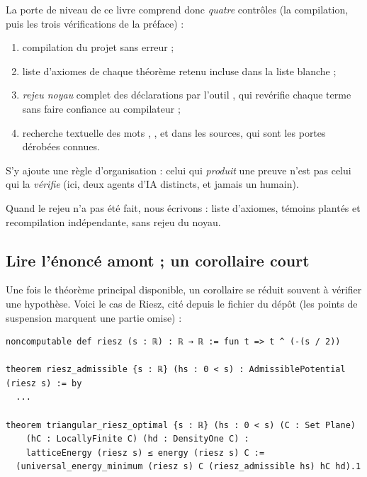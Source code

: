 La porte de niveau \tierA{} de ce livre comprend donc \emph{quatre} contrôles (la compilation, puis les trois vérifications de la préface) :
\begin{enumerate}
\item compilation du projet sans erreur ;
\item liste d'axiomes de chaque théorème retenu incluse dans la liste blanche ;
\item \emph{rejeu noyau} complet des déclarations par l'outil , qui revérifie chaque terme sans faire confiance au compilateur ;
\item recherche textuelle des mots , ,  et  dans les sources, qui sont les portes dérobées connues.
\end{enumerate}
S'y ajoute une règle d'organisation : celui qui \emph{produit} une preuve n'est pas celui qui la \emph{vérifie} (ici, deux agents d'IA distincts, et jamais un humain).

Quand le rejeu  n'a pas été fait, nous écrivons \tierAs{} : liste d'axiomes, témoins plantés et recompilation indépendante, sans rejeu du noyau.

\subsection{Lire l'énoncé amont ; un corollaire court}

Une fois le théorème principal disponible, un corollaire se réduit souvent à vérifier une hypothèse. Voici le cas de Riesz,
cité depuis le fichier  du dépôt (les points de suspension marquent une partie omise) :

\begin{leanbox}
\begin{lstlisting}[language=Lean]
noncomputable def riesz (s : ℝ) : ℝ → ℝ := fun t => t ^ (-(s / 2))

theorem riesz_admissible {s : ℝ} (hs : 0 < s) : AdmissiblePotential (riesz s) := by
  ...

theorem triangular_riesz_optimal {s : ℝ} (hs : 0 < s) (C : Set Plane)
    (hC : LocallyFinite C) (hd : DensityOne C) :
    latticeEnergy (riesz s) ≤ energy (riesz s) C :=
  (universal_energy_minimum (riesz s) C (riesz_admissible hs) hC hd).1
\end{lstlisting}
\end{leanbox}

